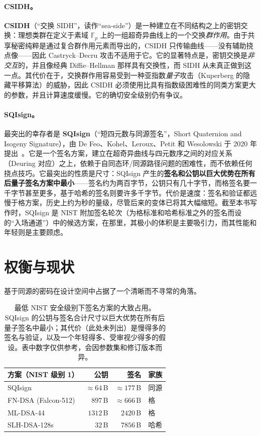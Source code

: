 \paragraph{CSIDH。}
\textbf{CSIDH}（“交换 SIDH”，读作“sea-side”）是一种建立在不同结构之上的密钥交换：理想类群在定义于素域 $\mathbb{F}_p$ 上的一组超奇异曲线上的一个交换\emph{群作用}。由于共享秘密纯粹是通过复合群作用元素而导出的，CSIDH 只传输曲线——没有辅助挠点像——因此 Castryck--Decru 攻击不适用于它。它的显著特点是，密钥交换是\emph{非交互}的，并且像经典 Diffie--Hellman 那样具有交换性，而 SIDH 从未真正做到这一点。其代价在于，交换群作用容易受到一种亚指数\emph{量子}攻击（Kuperberg 的隐藏平移算法）的威胁，因此 CSIDH 必须使用比具有指数级困难性的同类方案更大的参数，并且计算速度缓慢。它的确切安全级别仍有争议。

\paragraph{SQIsign。}
最突出的幸存者是 \textbf{SQIsign}（“短四元数与同源签名”，Short Quaternion and Isogeny Signature），由 De Feo、Kohel、Leroux、Petit 和 Wesolowski 于 2020 年提出~\cite{sqisign2020}。它是一个签名方案，建立在超奇异曲线与四元数序之间的对应关系（Deuring 对应）之上，依赖于自同态环/同源路径问题的困难性，而不依赖任何挠点技巧。它最突出的性质是尺寸：SQIsign 产生的\textbf{签名和公钥以巨大优势在所有后量子签名方案中最小}——签名约为两百字节，公钥只有几十字节，而格签名要一千字节甚至更多，基于哈希的签名则要许多千字节。代价是速度：签名和验证都远慢于格方案，历史上约为秒的量级，尽管后来的变体已将其大幅缩短。截至本书写作时，SQIsign 是 NIST 附加签名轮次（为格标准和哈希标准之外的签名而设的“入场通道”）中的候选方案，在那里，其极小的体积是主要吸引力，而其性能和年轻则是主要顾虑。

\section{权衡与现状}

基于同源的密码在设计空间中占据了一个清晰而不寻常的角落。

\begin{table}[H]
\centering
\begin{tabular}{lrrl}
\toprule
方案（NIST 级别 1） & 公钥 & 签名 & 家族 \\
\midrule
SQIsign        & $\approx 64$\,B   & $\approx 177$\,B  & 同源 \\
FN-DSA (Falcon-512) & $897$\,B      & $\approx 666$\,B  & 格 \\
ML-DSA-44      & $1312$\,B         & $2420$\,B         & 格 \\
SLH-DSA-128s   & $32$\,B           & $7856$\,B         & 哈希 \\
\bottomrule
\end{tabular}
\caption{最低 NIST 安全级别下签名方案的大致占用。SQIsign 的公钥与签名合计尺寸以巨大优势在所有后量子签名中最小；其代价（此处未列出）是慢得多的签名与验证，以及一个年轻得多、受审视少得多的假设。表中数字仅供参考，会因参数集和修订版本而异。}
\label{tab:sqisign-vs}
\end{table}

